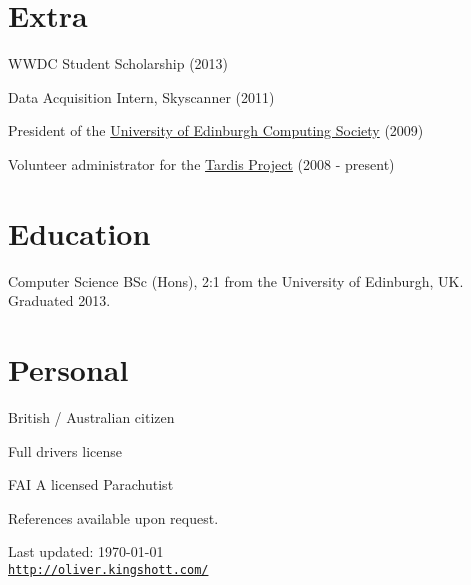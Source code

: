 \documentclass[a4paper]{article}
\def\footerlink{http://oliver.kingshott.com/}
\renewenvironment{itemize}{
  \begin{list}{}{
    \setlength{\leftmargin}{1.5em}
  }
}{
  \end{list}
}
\begin{document}
\section*{Extra}
\begin{itemize}
\item WWDC Student Scholarship (2013)
\item Data Acquisition Intern, Skyscanner (2011)
\item President of the \href{https://comp-soc.com}{University of Edinburgh Computing Society} (2009)
\item Volunteer administrator for the \href{http://www.tardis.ed.ac.uk/}{Tardis Project} (2008 - present)
\end{itemize}

\section*{Education}
\begin{itemize}
  \item Computer Science BSc (Hons), 2:1 from the University of Edinburgh, UK. Graduated 2013. 
\end{itemize}

\section*{Personal}

\begin{itemize}
\item British / Australian citizen
\item Full drivers license
\item FAI A licensed Parachutist
\item References available upon request.
\end{itemize}

\smallskip

\begin{center}
  \begin{footnotesize}
    Last updated: \today \\
    \href{\footerlink}{\texttt{\footerlink}}
  \end{footnotesize}
\end{center}
\end{document}
